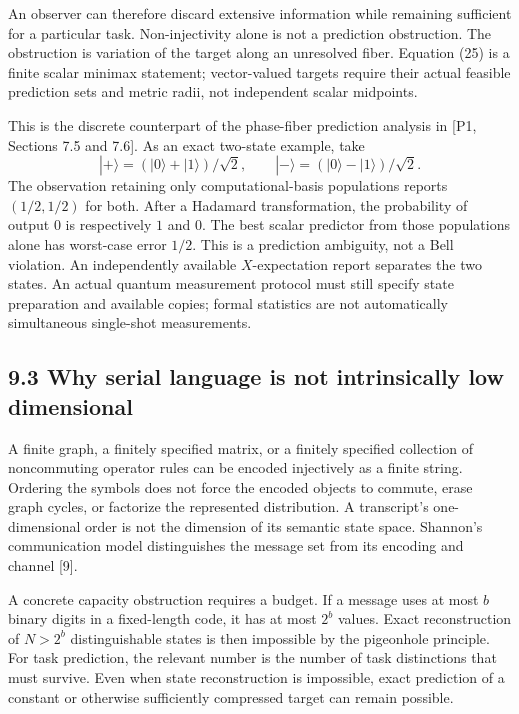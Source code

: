 \documentclass[
]{article}
\begin{document}
An observer can therefore discard extensive information while remaining sufficient for a particular task. Non-injectivity alone is not a prediction obstruction. The obstruction is variation of the target along an unresolved fiber. Equation (25) is a finite scalar minimax statement; vector-valued targets require their actual feasible prediction sets and metric radii, not independent scalar midpoints.

This is the discrete counterpart of the phase-fiber prediction analysis in {[}P1, Sections 7.5 and 7.6{]}. As an exact two-state example, take
\[
|+\rangle=(|0\rangle+|1\rangle)/\sqrt2,\qquad
|-\rangle=(|0\rangle-|1\rangle)/\sqrt2.
\]
The observation retaining only computational-basis populations reports \((1/2,1/2)\) for both. After a Hadamard transformation, the probability of output \(0\) is respectively \(1\) and \(0\). The best scalar predictor from those populations alone has worst-case error \(1/2\). This is a prediction ambiguity, not a Bell violation. An independently available \(X\)-expectation report separates the two states. An actual quantum measurement protocol must still specify state preparation and available copies; formal statistics are not automatically simultaneous single-shot measurements.

\subsection{9.3 Why serial language is not intrinsically low dimensional}\label{why-serial-language-is-not-intrinsically-low-dimensional}

A finite graph, a finitely specified matrix, or a finitely specified collection of noncommuting operator rules can be encoded injectively as a finite string. Ordering the symbols does not force the encoded objects to commute, erase graph cycles, or factorize the represented distribution. A transcript's one-dimensional order is not the dimension of its semantic state space. Shannon's communication model distinguishes the message set from its encoding and channel {[}9{]}.

A concrete capacity obstruction requires a budget. If a message uses at most \(b\) binary digits in a fixed-length code, it has at most \(2^b\) values. Exact reconstruction of \(N>2^b\) distinguishable states is then impossible by the pigeonhole principle. For task prediction, the relevant number is the number of task distinctions that must survive. Even when state reconstruction is impossible, exact prediction of a constant or otherwise sufficiently compressed target can remain possible.
\end{document}
